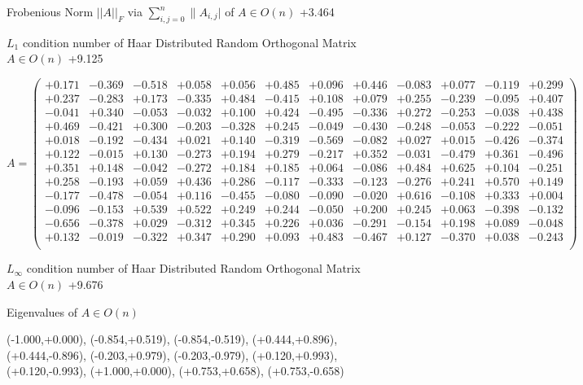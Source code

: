 \documentclass[9pt]{article}
\theoremstyle{plain}
\theoremstyle{definition}
\theoremstyle{remark}
\numberwithin{equation}{section}
\begin{document}
Frobenious Norm  $||A||_{\textit{F}}$ via $\sum\limits_{i,j =0}^{n} \|A_{i,j}|$   of  $A \in O(n)$  +3.464

$L_1$ condition number of Haar Distributed Random Orthogonal Matrix $A \in O(n)$ +9.125

$A = \left(
\begin{array}{
cccccccccccc}
+0.171 & -0.369 & -0.518 & +0.058 & +0.056 & +0.485 & +0.096 & +0.446 & -0.083 & +0.077 & -0.119 & +0.299 \\
+0.237 & -0.283 & +0.173 & -0.335 & +0.484 & -0.415 & +0.108 & +0.079 & +0.255 & -0.239 & -0.095 & +0.407 \\
-0.041 & +0.340 & -0.053 & -0.032 & +0.100 & +0.424 & -0.495 & -0.336 & +0.272 & -0.253 & -0.038 & +0.438 \\
+0.469 & -0.421 & +0.300 & -0.203 & -0.328 & +0.245 & -0.049 & -0.430 & -0.248 & -0.053 & -0.222 & -0.051 \\
+0.018 & -0.192 & -0.434 & +0.021 & +0.140 & -0.319 & -0.569 & -0.082 & +0.027 & +0.015 & -0.426 & -0.374 \\
+0.122 & -0.015 & +0.130 & -0.273 & +0.194 & +0.279 & -0.217 & +0.352 & -0.031 & -0.479 & +0.361 & -0.496 \\
+0.351 & +0.148 & -0.042 & -0.272 & +0.184 & +0.185 & +0.064 & -0.086 & +0.484 & +0.625 & +0.104 & -0.251 \\
+0.258 & -0.193 & +0.059 & +0.436 & +0.286 & -0.117 & -0.333 & -0.123 & -0.276 & +0.241 & +0.570 & +0.149 \\
-0.177 & -0.478 & -0.054 & +0.116 & -0.455 & -0.080 & -0.090 & -0.020 & +0.616 & -0.108 & +0.333 & +0.004 \\
-0.096 & -0.153 & +0.539 & +0.522 & +0.249 & +0.244 & -0.050 & +0.200 & +0.245 & +0.063 & -0.398 & -0.132 \\
-0.656 & -0.378 & +0.029 & -0.312 & +0.345 & +0.226 & +0.036 & -0.291 & -0.154 & +0.198 & +0.089 & -0.048 \\
+0.132 & -0.019 & -0.322 & +0.347 & +0.290 & +0.093 & +0.483 & -0.467 & +0.127 & -0.370 & +0.038 & -0.243 \\
\end{array}
\right)$ \newline 

$L_{\infty}$ condition number of Haar Distributed Random Orthogonal Matrix $A \in O(n)$ +9.676

Eigenvalues of $A \in O(n)$

(-1.000,+0.000), (-0.854,+0.519), (-0.854,-0.519), (+0.444,+0.896), (+0.444,-0.896), (-0.203,+0.979), (-0.203,-0.979), (+0.120,+0.993), (+0.120,-0.993), (+1.000,+0.000), (+0.753,+0.658), (+0.753,-0.658)
\end{document}
